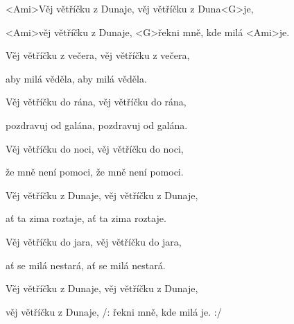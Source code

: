 

\zs
<Ami>Věj větříčku z Dunaje, věj větříčku z Duna<G>je,

<Ami>věj větříčku z Dunaje, <G>řekni mně, kde milá <Ami>je.
\ks

\zs
Věj větříčku z večera, věj větříčku z večera,

aby milá věděla, aby milá věděla.
\ks

\zs
Věj větříčku do rána, věj větříčku do rána,

pozdravuj od galána, pozdravuj od galána.
\ks

\zs
Věj větříčku do noci, věj větříčku do noci,

že mně není pomoci, že mně není pomoci.
\ks

\zs
Věj větříčku z Dunaje, věj větříčku z Dunaje,

ať ta zima roztaje, ať ta zima roztaje.
\ks

\zs
Věj větříčku do jara, věj větříčku do jara,

ať se milá nestará, ať se milá nestará.
\ks

\zs
Věj větříčku z Dunaje, věj větříčku z Dunaje,

věj větříčku z Dunaje, /: řekni mně, kde milá je. :/
\ks

\kp
